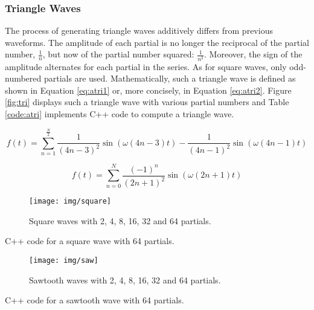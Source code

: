 \subsubsection{Triangle Waves}

The process of generating triangle waves additively differs from previous waveforms. The amplitude of each partial is no longer the reciprocal of the partial number, $\frac{1}{n}$, but now of the partial number squared: $\frac{1}{n^2}$. Moreover, the sign of the amplitude alternates for each partial in the series. As for square waves, only odd-numbered partials are used. Mathematically, such a triangle wave is defined as shown in Equation \ref{eq:atri1} or, more concisely, in Equation \ref{eq:atri2}. Figure \ref{fig:tri} displays such a triangle wave with various partial numbers and Table \ref{code:atri} implements C++ code to compute a triangle wave.

\begin{equation}
  f(t) = \sum\limits_{n=1}^\frac{N}{2} \frac{1}{(4n-3)^2}\sin(\omega (4n-3) t) - \frac{1}{(4n-1)^2}\sin(\omega (4n-1) t)
  \label{eq:atri1}
\end{equation}

\begin{equation}
  f(t) = \sum\limits_{n=0}^N \frac{(-1)^n}{(2n+1)^2} \sin(\omega (2n + 1) t)
  \label{eq:atri2}
\end{equation}

\pagebreak

\begin{figure}[h!]
  \texttt{[image: img/square]}
  \caption{Square waves with 2, 4, 8, 16, 32 and 64 partials.}
  \label{fig:square}
\end{figure}

\begin{table}[h!]
  \caption{C++ code for a square wave with 64 partials.}
  \label{code:asquare}
\end{table}

\pagebreak

\begin{figure}[h!]
  \texttt{[image: img/saw]}
  \caption{Sawtooth waves with 2, 4, 8, 16, 32 and 64 partials.}
  \label{fig:saw}
\end{figure}

\begin{table}[h!]
  \caption{C++ code for a sawtooth wave with 64 partials.}
  \label{code:asaw}
\end{table}

